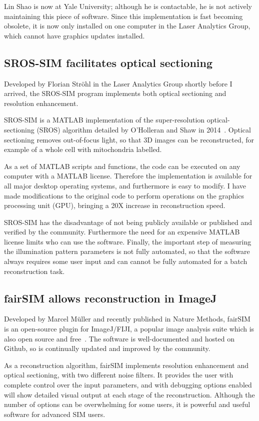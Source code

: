 Lin Shao is now at Yale University; although he is contactable, he is not actively maintaining this piece of software.
Since this implementation is fast becoming obsolete, it is now only installed on one computer in the Laser Analytics Group, which cannot have graphics updates installed. 

\subsection{SROS-SIM facilitates optical sectioning}
Developed by Florian Str\"ohl in the Laser Analytics Group shortly before I arrived, the SROS-SIM program implements both optical sectioning and resolution enhancement. 

SROS-SIM is a MATLAB implementation of the super-resolution optical-sectioning (SROS) algorithm detailed by O'Holleran and Shaw in 2014~\cite{oholleran2014optimized}. 
Optical sectioning removes out-of-focus light, so that 3D images can be reconstructed, for example of a whole cell with mitochondria labelled.

As a set of MATLAB scripts and functions, the code can be executed on any computer with a MATLAB license.
Therefore the implementation is available for all major desktop operating systems, and furthermore is easy to modify.
I have made modifications to the original code to perform operations on the graphics processing unit (GPU), bringing a 20X increase in reconstruction speed. 

SROS-SIM has the disadvantage of not being publicly available or published and verified by the community.
Furthermore the need for an expensive MATLAB license limits who can use the software. 
Finally, the important step of measuring the illumination pattern parameters is not fully automated, so that the software always requires some user input and can cannot be fully automated for a batch reconstruction task.

\subsection{fairSIM allows reconstruction in ImageJ}
Developed by Marcel M\"uller and recently published in Nature Methods, fairSIM is an open-source plugin for ImageJ/FIJI, a popular image analysis suite which is also open source and free~\cite{muller2016open}. 
The software is well-documented and hosted on Github, so is continually updated and improved by the community. 

As a reconstruction algorithm, fairSIM implements resolution enhancement and optical sectioning, with two different noise filters. 
It provides the user with complete control over the input parameters, and with debugging options enabled will show detailed visual output at each stage of the reconstruction. 
Although the number of options can be overwhelming for some users, it is powerful and useful software for advanced SIM users. 

